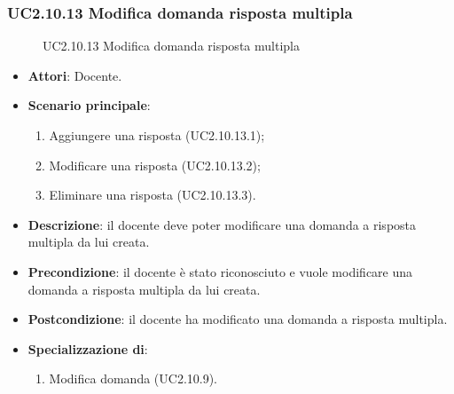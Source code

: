 \subsubsection{UC2.10.13 Modifica domanda risposta multipla}
\begin{figure}[H]
\centering
\noindent{}
\caption{UC2.10.13 Modifica domanda risposta multipla}
\end{figure}
\begin{itemize}
\item \textbf{Attori}: Docente.
\item \textbf{Scenario principale}:
\begin{enumerate}
\item Aggiungere una risposta (UC2.10.13.1);
\item Modificare una risposta (UC2.10.13.2);
\item Eliminare una risposta (UC2.10.13.3).
\end{enumerate}
\item \textbf{Descrizione}: il docente deve poter modificare una domanda a risposta multipla da lui creata.
\item \textbf{Precondizione}: il docente è stato riconosciuto e vuole modificare una domanda a risposta multipla da lui creata.
\item \textbf{Postcondizione}: il docente ha modificato una domanda a risposta multipla.
\item \textbf{Specializzazione di}:
\begin{enumerate}
\item Modifica domanda (UC2.10.9).
\end{enumerate}
\end{itemize}
